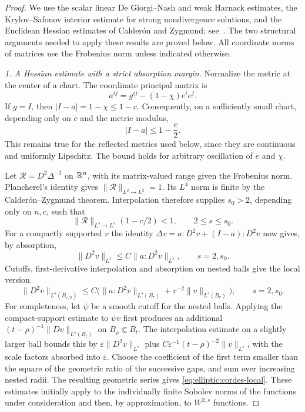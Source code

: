 \begin{proof}
We use the scalar linear De Giorgi--Nash and weak Harnack estimates,
the Krylov--Safonov interior estimate for strong nondivergence solutions,
and the Euclidean Hessian estimates of Calder\'on and Zygmund;
see~\cite{GilbargTrudinger}.  The two structural
arguments needed to apply these results are proved below.  All coordinate
norms of matrices use the Frobenius norm unless indicated otherwise.

\medskip\noindent
\emph{1. A Hessian estimate with a strict absorption margin.}
Normalize the metric at the center of a chart.  The coordinate principal
matrix is
\[
 a^{ij}=g^{ij}-(1-\chi)e^i e^j.
\]
If $g=I$, then $|I-a|=1-\chi\leq1-c$.  Consequently, on a sufficiently
small chart, depending only on $c$ and the metric modulus,
\begin{equation}
 |I-a|\leq1-\frac c2.
 \label{eq:elliptic:cordes-margin}
\end{equation}
This remains true for the reflected metrics used below, since they are
continuous and uniformly Lipschitz.  The bound holds for arbitrary
oscillation of $e$ and $\chi$.

Let $\mathcal R=D^2\Delta^{-1}$ on $\mathbb R^n$, with its matrix-valued range
given the Frobenius norm.  Plancherel's identity gives
$\|\mathcal R\|_{L^2\to L^2}=1$.  Its $L^4$ norm is finite by the
Calder\'on--Zygmund theorem.  Interpolation therefore supplies
$s_0>2$, depending only on $n,c$, such that
\[
 \|\mathcal R\|_{L^s\to L^s}(1-c/2)<1,
 \qquad 2\leq s\leq s_0.
\]
For a compactly supported $v$ the identity
$\Delta v=a:D^2v+(I-a):D^2v$ now gives, by absorption,
\[
 \|D^2v\|_{L^s}\leq C\|a:D^2v\|_{L^s},
 \qquad s=2,s_0.
\]
Cutoffs, first-derivative interpolation and absorption on nested balls
give the local version
\begin{equation}
 \|D^2v\|_{L^s(B_{r/2})}
 \leq C\bigl(\|a:D^2v\|_{L^s(B_r)}
              +r^{-2}\|v\|_{L^s(B_r)}\bigr),
 \qquad s=2,s_0.
 \label{eq:elliptic:cordes-local}
\end{equation}
For completeness, let $\psi$ be a smooth cutoff for the nested balls.
Applying the compact-support estimate to $\psi v$ first produces an additional
$(t-\rho)^{-1}\|Dv\|_{L^s(B_t)}$ on $B_\rho\Subset B_t$.
The interpolation estimate on a slightly larger ball bounds this by
$\varepsilon\|D^2v\|_{L^s}$ plus
$C\varepsilon^{-1}(t-\rho)^{-2}\|v\|_{L^s}$, with the scale factors
absorbed into $\varepsilon$.  Choose the coefficient of the first term
smaller than the square of the geometric ratio of the successive gaps,
and sum over increasing nested radii.  The resulting geometric series
gives \eqref{eq:elliptic:cordes-local}.
These estimates initially apply to the individually finite Sobolev norms
of the functions under consideration and then, by approximation, to
$W^{2,s}$ functions.


\end{proof}

